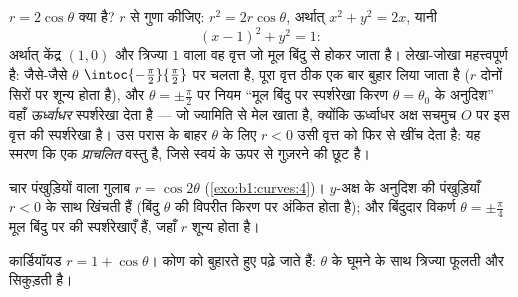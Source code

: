 \begin{example}[ध्रुवीय से कार्तीय: एक छिपा वृत्त]
\label{ex:b1:curves:polarcircle}
 $r = 2\cos\theta$ क्या है? $r$ से गुणा कीजिए: $r^2 =
2r\cos\theta$, अर्थात् $x^2 + y^2 = 2x$, यानी
\[
(x - 1)^2 + y^2 = 1 :
\]
अर्थात् केंद्र $(1, 0)$ और त्रिज्या $1$ वाला वह वृत्त जो मूल बिंदु से होकर
जाता है। लेखा-जोखा महत्त्वपूर्ण है: जैसे-जैसे $\theta$
$\intoc{-\frac\pi2}{\frac\pi2}$ पर चलता है, पूरा वृत्त ठीक एक बार बुहार लिया
जाता है ($r$ दोनों सिरों पर शून्य होता है), और $\theta = \pm\frac\pi2$ पर
नियम ``मूल बिंदु पर स्पर्शरेखा किरण $\theta = \theta_0$ के अनुदिश'' वहाँ
\emph{ऊर्ध्वाधर} स्पर्शरेखा देता है --- जो ज्यामिति से मेल खाता है, क्योंकि
ऊर्ध्वाधर अक्ष सचमुच $O$ पर इस वृत्त की स्पर्शरेखा है। उस परास के बाहर
$\theta$ के लिए $r < 0$ उसी वृत्त को फिर से खींच देता है: यह स्मरण कि
 एक \emph{प्राचलित} वस्तु है, जिसे स्वयं के ऊपर से गुज़रने की
छूट है।
\end{example}

\begin{omfigure}

{\small चार पंखुड़ियों वाला गुलाब $r = \cos 2\theta$
(\cref{exo:b1:curves:4})। $y$-अक्ष के अनुदिश की पंखुड़ियाँ $r < 0$ के साथ
खिंचती हैं (बिंदु $\theta$ की विपरीत किरण पर अंकित होता है); और बिंदुदार
विकर्ण $\theta = \pm\frac\pi4$ मूल बिंदु पर की स्पर्शरेखाएँ हैं, जहाँ $r$
शून्य होता है।}
\end{omfigure}

\begin{omfigure}

{\small कार्डियॉयड $r = 1 + \cos\theta$।  कोण को बुहारते हुए
पढ़े जाते हैं: $\theta$ के घूमने के साथ त्रिज्या फूलती और सिकुड़ती है।}
\end{omfigure}

